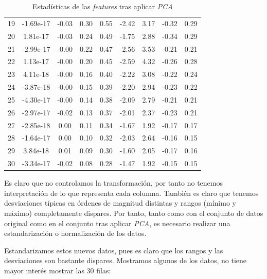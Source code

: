 \documentclass[11pt]{article}
\begin{document}
\begin{table}[H]
{\begin{tabular}{|c|c|c|c|c|c|c|c|c|}
19   & -1.69e-17&  -0.03&    0.30&   0.55&   -2.42&    3.17&  -0.32&   0.29 \\
20   &  1.81e-17&  -0.03&    0.24&   0.49&   -1.75&    2.88&  -0.34&   0.29 \\
21   & -2.99e-17&  -0.00&    0.22&   0.47&   -2.56&    3.53&  -0.21&   0.21 \\
22   &  1.13e-17&  -0.00&    0.20&   0.45&   -2.59&    4.32&  -0.26&   0.28 \\
23   &  4.11e-18&  -0.00&    0.16&   0.40&   -2.22&    3.08&  -0.22&   0.24 \\
24   & -3.87e-18&  -0.00&    0.15&   0.39&   -2.20&    2.94&  -0.23&   0.22 \\
25   & -4.30e-17&  -0.00&    0.14&   0.38&   -2.09&    2.79&  -0.21&   0.21 \\
26   & -2.97e-17&  -0.02&    0.13&   0.37&   -2.01&    2.37&  -0.23&   0.21 \\
27   & -2.85e-18&   0.00&    0.11&   0.34&   -1.67&    1.92&  -0.17&   0.17 \\
28   & -1.64e-17&   0.00&    0.10&   0.32&   -2.03&    2.64&  -0.16&   0.15 \\
29   &  3.84e-18&   0.01&    0.09&   0.30&   -1.60&    2.05&  -0.17&   0.16 \\
30   & -3.34e-17&  -0.02&    0.08&   0.28&   -1.47&    1.92&  -0.15&   0.15 \\

\hline

\hline
    \end{tabular}
    }
    \caption{Estadísticas de las \emph{features} tras aplicar \emph{PCA}}
\end{table}

Es claro que no controlamos la transformación, por tanto no tenemos interpretación de lo que representa cada columna. También es claro que tenemos desviaciones típicas en órdenes de magnitud distintas y rangos (mínimo y máximo) completamente dispares. Por tanto, tanto como con el conjunto de datos original como en el conjunto tras aplicar \emph{PCA}, es necesario realizar una estandarización o normalización de los datos.

Estandarizamos estos nuevos datos, pues es claro que los rangos y las desviaciones son bastante dispares. Mostramos algunos de los datos, no tiene mayor interés mostrar las 30 filas:
\end{document}
